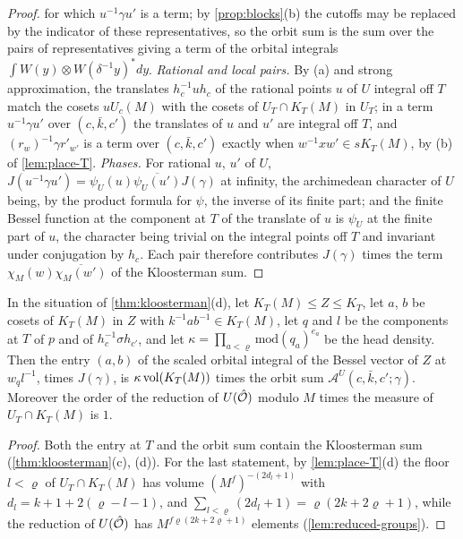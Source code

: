 \begin{proof}
for which $u^{-1}\gamma u'$ is a term; by \cref{prop:blocks}(b) the cutoffs may be replaced by the indicator of these representatives, so the orbit sum is the sum over the pairs of representatives giving a term of
the orbital integrals $\int W(y)\otimes W(\delta^{-1}y)^*dy$. \emph{Rational and local pairs.} By (a) and strong approximation, the translates $h_c^{-1}uh_c$ of the rational points $u$ of $U$ integral off $T$ match the cosets
$uU_c(M)$ with the cosets of $U_T\cap K_T(M)$ in $U_T$; in a term $u^{-1}\gamma u'$ over $(c,\bar k,c')$ the translates of $u$ and $u'$ are integral off $T$, and $(r_w)^{-1}\gamma r'_{w'}$ is a term over $(c,\bar k,c')$ exactly when
$w^{-1}xw'\in sK_T(M)$, by (b) of \cref{lem:place-T}. \emph{Phases.} For rational $u$, $u'$ of $U$, $J(u^{-1}\gamma u')=\psi_U(u)\overline{\psi_U(u')}J(\gamma)$ at infinity, the archimedean character of $U$ being, by the product formula for
$\psi$, the inverse of its finite part; and the finite Bessel function at the component at $T$ of the translate of $u$ is $\psi_U$ at the finite part of $u$, the character being trivial on the integral points off $T$ and
invariant under conjugation by $h_c$. Each pair therefore contributes $J(\gamma)$ times the term $\chi_M(w)\overline{\chi_M(w')}$ of the Kloosterman sum.
\end{proof}

\begin{corollary}\label{cor:orbit-entry}
In the situation of \cref{thm:kloosterman}(d), let $K_T(M)\le Z\le K_T$, let $a$, $b$ be cosets of $K_T(M)$ in $Z$ with $k^{-1}ab^{-1}\in K_T(M)$, let $q$ and $l$ be the components at $T$ of $p$ and of $h_c^{-1}\sigma h_{c'}$, and let
$\kappa=\prod_{a<\varrho}\mathrm{mod}(q_a)^{e_a}$ be the head density. Then the entry $(a,b)$ of the scaled orbital integral of the Bessel vector of $Z$ at $w_ql^{-1}$, times $J(\gamma)$, is $\kappa\operatorname{vol}(K_T(M))$ times the
orbit sum $\mathcal A^U(c,\bar k,c';\gamma)$. Moreover the order of the reduction of $U(\hat{\mathcal{O}})$ modulo $M$ times the measure of $U_T\cap K_T(M)$ is $1$.
\end{corollary}

\begin{proof}
Both the entry at $T$ and the orbit sum contain the Kloosterman sum (\cref{thm:kloosterman}(c), (d)). For the last statement, by \cref{lem:place-T}(d) the floor $l<\varrho$ of $U_T\cap K_T(M)$ has volume $(M^f)^{-(2d_l+1)}$ with
$d_l=k+1+2(\varrho-l-1)$, and $\sum_{l<\varrho}(2d_l+1)=\varrho(2k+2\varrho+1)$, while the reduction of $U(\hat{\mathcal{O}})$ has $M^{f\varrho(2k+2\varrho+1)}$ elements (\cref{lem:reduced-groups}).
\end{proof}

